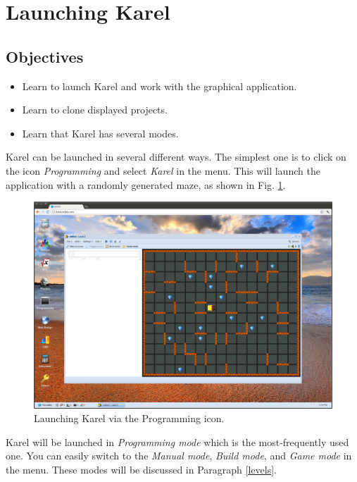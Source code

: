 \documentclass[article,A4,12pt]{llncs}
\begin{document}
\section{Launching Karel}

\subsection{Objectives} 
\begin{itemize}
\item Learn to launch Karel and work with the graphical application.
\item Learn to clone displayed projects.
\item Learn that Karel has several modes.
\end{itemize}
Karel can be launched in several different ways. The simplest one is to click on the icon 
{\em Programming} and select {\em Karel} in the menu. This will launch the application 
with a randomly generated maze, as shown in Fig. \ref{fig:init}.
\newpage


\begin{figure}[!ht]
\begin{center}
\includegraphics[width=\textwidth]{img/init.png}
\end{center}
\vspace{-2mm}
\caption{Launching Karel via the Programming icon.}
\label{fig:init}
\end{figure}
\noindent
Karel will be launched in {\em Programming mode} which is the most-frequently 
used one. You can easily switch to the {\em Manual mode}, {\em Build mode},
and {\em Game mode} in the menu. These modes will be discussed in Paragraph 
\ref{levels}.
\end{document}
